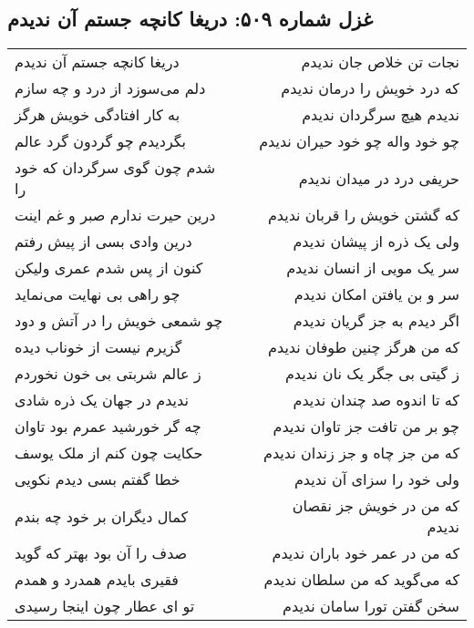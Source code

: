 \begin{center}
\section*{غزل شماره ۵۰۹: دریغا کانچه جستم آن ندیدم}
\label{sec:509}
\begin{longtable}{l p{0.5cm} r}
دریغا کانچه جستم آن ندیدم
&&
نجات تن خلاص جان ندیدم
\\
دلم می‌سوزد از درد و چه سازم
&&
که درد خویش را درمان ندیدم
\\
به کار افتادگی خویش هرگز
&&
ندیدم هیچ سرگردان ندیدم
\\
بگردیدم چو گردون گرد عالم
&&
چو خود واله چو خود حیران ندیدم
\\
شدم چون گوی سرگردان که خود را
&&
حریفی درد در میدان ندیدم
\\
درین حیرت ندارم صبر و غم اینت
&&
که گشتن خویش را قربان ندیدم
\\
درین وادی بسی از پیش رفتم
&&
ولی یک ذره از پیشان ندیدم
\\
کنون از پس شدم عمری ولیکن
&&
سر یک مویی از انسان ندیدم
\\
چو راهی بی نهایت می‌نماید
&&
سر و بن یافتن امکان ندیدم
\\
چو شمعی خویش را در آتش و دود
&&
اگر دیدم به جز گریان ندیدم
\\
گزیرم نیست از خوناب دیده
&&
که من هرگز چنین طوفان ندیدم
\\
ز عالم شربتی بی خون نخوردم
&&
ز گیتی بی جگر یک نان ندیدم
\\
ندیدم در جهان یک ذره شادی
&&
که تا اندوه صد چندان ندیدم
\\
چه گر خورشید عمرم بود تاوان
&&
چو بر من تافت جز تاوان ندیدم
\\
حکایت چون کنم از ملک یوسف
&&
که من جز چاه و جز زندان ندیدم
\\
خطا گفتم بسی دیدم نکویی
&&
ولی خود را سزای آن ندیدم
\\
کمال دیگران بر خود چه بندم
&&
که من در خویش جز نقصان ندیدم
\\
صدف را آن بود بهتر که گوید
&&
که من در عمر خود باران ندیدم
\\
فقیری بایدم همدرد و همدم
&&
که می‌گوید که من سلطان ندیدم
\\
تو ای عطار چون اینجا رسیدی
&&
سخن گفتن تورا سامان ندیدم
\\
\end{longtable}
\end{center}
